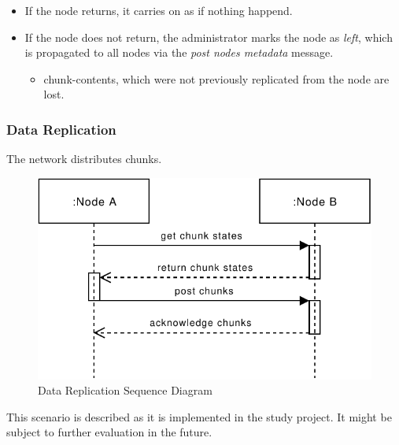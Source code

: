 \begin{itemize}
    \item If the \gls{node} returns, it carries on as if nothing happend.
    \item If the \gls{node} does not return, the \gls{administrator} marks the \gls{node} as \emph{left}, which is propagated to all \glspl{node} via the \emph{post nodes metadata} message.
        \begin{itemize}
            \item \glspl{chunk-content}, which were not previously replicated from the \gls{node} are lost.
        \end{itemize}
\end{itemize}

\subsubsection{Data Replication}\label{sec:scenario-data-replication}
The network distributes \glspl{chunk}.

\begin{figure}[h]
    \centering
    \includegraphics[width=0.6\linewidth]{resources/data_replication.pdf}
    \caption{Data Replication Sequence Diagram}
    \label{fig:data-replication}
\end{figure}

This scenario is described as it is implemented in the study project. It might be subject to further evaluation in the future.

